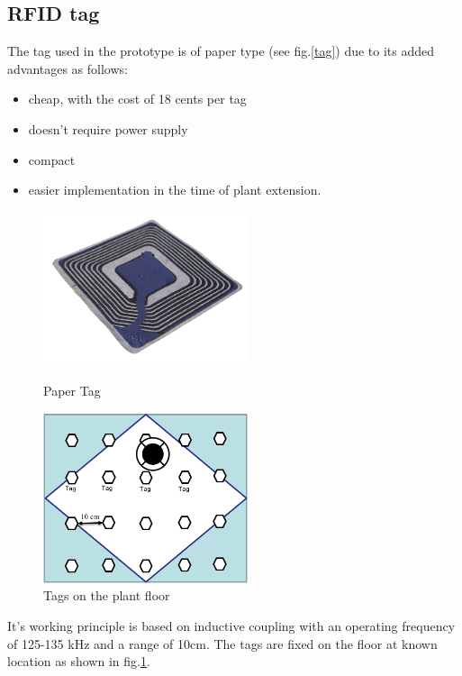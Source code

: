 \subsection{RFID tag}
The tag used in the prototype is of paper type (see fig.\ref{tag}) due to its added advantages as follows:
\begin{itemize}
	\item cheap, with the cost of 18 cents per tag
	\item doesn't require power supply
	\item compact
	\item easier implementation in the time of plant extension.
\end{itemize}
\begin{figure}[!htbp]
	\centering
	\begin{minipage}{.5\textwidth}
		\centering
		\includegraphics[width = 6cm]{Pictures/tag}%
		\caption{Paper Tag}
		\label{tag}
	\end{minipage}%
	\begin{minipage}{.5\textwidth}
		\centering
		\includegraphics[width = 6cm]{Pictures/tagsfloor}%
		\caption{Tags on the plant floor}
		\label{tags_floor}
	\end{minipage}
\end{figure}
It's working principle is based on inductive coupling with an operating frequency of 125-135 kHz and a range of 10cm. The tags are fixed on the floor at known location as shown in fig.\ref{tags_floor}.
